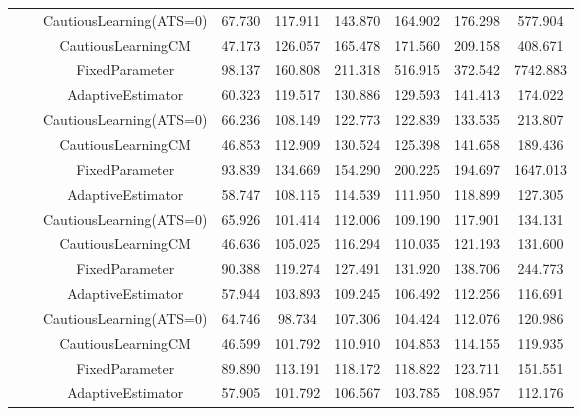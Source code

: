 \begin{table}[!h]
\begin{tabular}[t]{ccccccccc}
 &  & CautiousLearning(ATS=0) & 67.730 & 117.911 & 143.870 & 164.902 & 176.298 & 577.904\\

 &  & CautiousLearningCM & 47.173 & 126.057 & 165.478 & 171.560 & 209.158 & 408.671\\

 & \multirow[t]{-4}{*}{\centering\arraybackslash 0.35} & FixedParameter & 98.137 & 160.808 & 211.318 & 516.915 & 372.542 & 7742.883\\
\cmidrule{2-9}
 &  & AdaptiveEstimator & 60.323 & 119.517 & 130.886 & 129.593 & 141.413 & 174.022\\

 &  & CautiousLearning(ATS=0) & 66.236 & 108.149 & 122.773 & 122.839 & 133.535 & 213.807\\

 &  & CautiousLearningCM & 46.853 & 112.909 & 130.524 & 125.398 & 141.658 & 189.436\\

 & \multirow[t]{-4}{*}{\centering\arraybackslash 0.50} & FixedParameter & 93.839 & 134.669 & 154.290 & 200.225 & 194.697 & 1647.013\\
\cmidrule{2-9}
 &  & AdaptiveEstimator & 58.747 & 108.115 & 114.539 & 111.950 & 118.899 & 127.305\\

 &  & CautiousLearning(ATS=0) & 65.926 & 101.414 & 112.006 & 109.190 & 117.901 & 134.131\\

 &  & CautiousLearningCM & 46.636 & 105.025 & 116.294 & 110.035 & 121.193 & 131.600\\

 & \multirow[t]{-4}{*}{\centering\arraybackslash 0.75} & FixedParameter & 90.388 & 119.274 & 127.491 & 131.920 & 138.706 & 244.773\\
\cmidrule{2-9}
 &  & AdaptiveEstimator & 57.944 & 103.893 & 109.245 & 106.492 & 112.256 & 116.691\\

 &  & CautiousLearning(ATS=0) & 64.746 & 98.734 & 107.306 & 104.424 & 112.076 & 120.986\\

 &  & CautiousLearningCM & 46.599 & 101.792 & 110.910 & 104.853 & 114.155 & 119.935\\

 & \multirow[t]{-4}{*}{\centering\arraybackslash 1.00} & FixedParameter & 89.890 & 113.191 & 118.172 & 118.822 & 123.711 & 151.551\\
\cmidrule{2-9}
 &  & AdaptiveEstimator & 57.905 & 101.792 & 106.567 & 103.785 & 108.957 & 112.176\\


\end{tabular}
\end{table}
